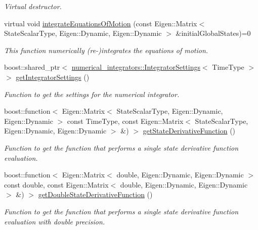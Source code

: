 \begin{DoxyCompactItemize}
\begin{DoxyCompactList}\small\item\em Virtual destructor. \end{DoxyCompactList}\item 
virtual void \hyperlink{classtudat_1_1propagators_1_1DynamicsSimulator_ae88b5eb4a3e70b135a99dd790997062b}{integrate\+Equations\+Of\+Motion} (const Eigen\+::\+Matrix$<$ State\+Scalar\+Type, Eigen\+::\+Dynamic, Eigen\+::\+Dynamic $>$ \&initial\+Global\+States)=0
\begin{DoxyCompactList}\small\item\em This function numerically (re-\/)integrates the equations of motion. \end{DoxyCompactList}\item 
boost\+::shared\+\_\+ptr$<$ \hyperlink{classtudat_1_1numerical__integrators_1_1IntegratorSettings}{numerical\+\_\+integrators\+::\+Integrator\+Settings}$<$ Time\+Type $>$ $>$ \hyperlink{classtudat_1_1propagators_1_1DynamicsSimulator_af924ad8058f25817d7aca5cff4154fc9}{get\+Integrator\+Settings} ()
\begin{DoxyCompactList}\small\item\em Function to get the settings for the numerical integrator. \end{DoxyCompactList}\item 
boost\+::function$<$ Eigen\+::\+Matrix$<$ State\+Scalar\+Type, Eigen\+::\+Dynamic, Eigen\+::\+Dynamic $>$ const Time\+Type, const Eigen\+::\+Matrix$<$ State\+Scalar\+Type, Eigen\+::\+Dynamic, Eigen\+::\+Dynamic $>$ \&) $>$ \hyperlink{classtudat_1_1propagators_1_1DynamicsSimulator_a80a48586431310115343f7fcc7412b4a}{get\+State\+Derivative\+Function} ()
\begin{DoxyCompactList}\small\item\em Function to get the function that performs a single state derivative function evaluation. \end{DoxyCompactList}\item 
boost\+::function$<$ Eigen\+::\+Matrix$<$ double, Eigen\+::\+Dynamic, Eigen\+::\+Dynamic $>$ const double, const Eigen\+::\+Matrix$<$ double, Eigen\+::\+Dynamic, Eigen\+::\+Dynamic $>$ \&) $>$ \hyperlink{classtudat_1_1propagators_1_1DynamicsSimulator_a7db72db47278cc8ce298704456c66992}{get\+Double\+State\+Derivative\+Function} ()
\begin{DoxyCompactList}\small\item\em Function to get the function that performs a single state derivative function evaluation with double precision. \end{DoxyCompactList}\item 

\end{DoxyCompactItemize}
